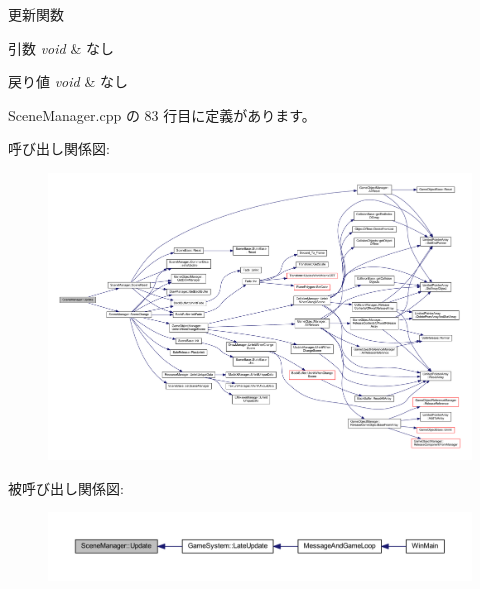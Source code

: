 更新関数 


\begin{DoxyParams}{引数}
{\em void} & なし \\
\hline
\end{DoxyParams}

\begin{DoxyRetVals}{戻り値}
{\em void} & なし \\
\hline
\end{DoxyRetVals}


 Scene\+Manager.\+cpp の 83 行目に定義があります。

呼び出し関係図\+:
\nopagebreak
\begin{figure}[H]
\begin{center}
\leavevmode
\includegraphics[width=350pt]{class_scene_manager_a63dcf65832d6a2c190bf496d9a3b00a3_cgraph}
\end{center}
\end{figure}
被呼び出し関係図\+:
\nopagebreak
\begin{figure}[H]
\begin{center}
\leavevmode
\includegraphics[width=350pt]{class_scene_manager_a63dcf65832d6a2c190bf496d9a3b00a3_icgraph}
\end{center}
\end{figure}
\mbox{\label{class_scene_manager_a493bc0d65558ce004f6f248a185ba956}} 
